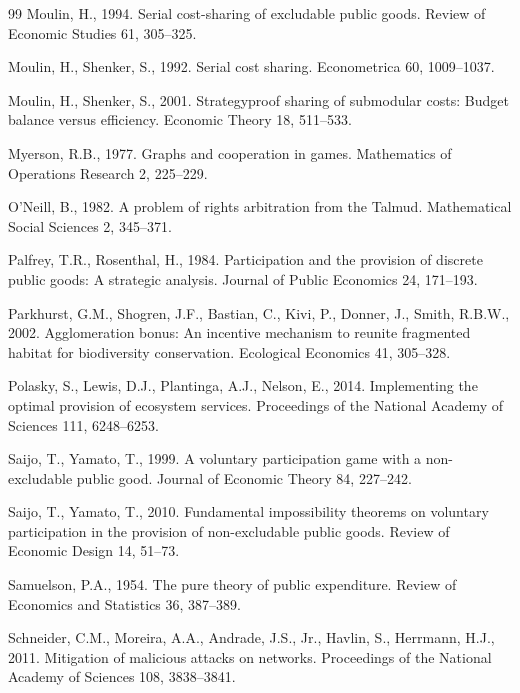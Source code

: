 \documentclass[preprint,12pt,authoryear]{elsarticle}
\begin{document}
\begin{thebibliography}{99}
Moulin, H., 1994.
Serial cost-sharing of excludable public goods.
Review of Economic Studies 61, 305--325.

Moulin, H., Shenker, S., 1992.
Serial cost sharing. Econometrica 60, 1009--1037.

Moulin, H., Shenker, S., 2001.
Strategyproof sharing of submodular costs: Budget balance versus efficiency.
Economic Theory 18, 511--533.

Myerson, R.B., 1977.
Graphs and cooperation in games. Mathematics of Operations Research 2,
225--229.

O'Neill, B., 1982.
A problem of rights arbitration from the Talmud.
Mathematical Social Sciences 2, 345--371.

Palfrey, T.R., Rosenthal, H., 1984.
Participation and the provision of discrete public goods: A strategic
analysis. Journal of Public Economics 24, 171--193.

Parkhurst, G.M., Shogren, J.F., Bastian, C., Kivi, P., Donner, J.,
Smith, R.B.W., 2002.
Agglomeration bonus: An incentive mechanism to reunite fragmented habitat for
biodiversity conservation. Ecological Economics 41, 305--328.

Polasky, S., Lewis, D.J., Plantinga, A.J., Nelson, E., 2014.
Implementing the optimal provision of ecosystem services.
Proceedings of the National Academy of Sciences 111, 6248--6253.

Saijo, T., Yamato, T., 1999.
A voluntary participation game with a non-excludable public good.
Journal of Economic Theory 84, 227--242.

Saijo, T., Yamato, T., 2010.
Fundamental impossibility theorems on voluntary participation in the
provision of non-excludable public goods.
Review of Economic Design 14, 51--73.

Samuelson, P.A., 1954.
The pure theory of public expenditure.
Review of Economics and Statistics 36, 387--389.

Schneider, C.M., Moreira, A.A., Andrade, J.S., Jr., Havlin, S., Herrmann, H.J.,
2011. Mitigation of malicious attacks on networks.
Proceedings of the National Academy of Sciences 108, 3838--3841.


\end{thebibliography}
\end{document}
